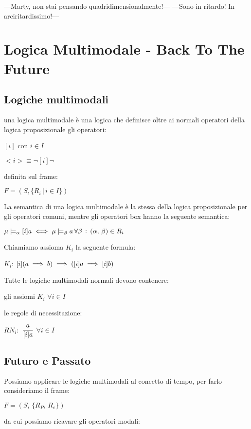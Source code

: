 \begin{savequote}[50mm]
---Marty, non stai pensando quadridimensionalmente!---
---Sono in ritardo! In arciritardissimo!---
 \end{savequote}


\chapter{Logica Multimodale - Back To The Future}


\section{Logiche multimodali}

una logica multimodale è una logica che definisce oltre ai normali
operatori della logica proposizionale gli operatori:

$[i]$ con $i\in I$

$<i>\equiv\neg[i]\neg$

definita sul frame:

$F=(S,\{R_{i}\,|\, i\in I\})$ 

La semantica di una logica multimodale è la stessa della logica proposizionale
per gli operatori comuni, mentre gli operatori box hanno la seguente
semantica:

$\mu\models_{\alpha}[i]a\iff\mu\models_{\beta}a\,\forall\beta\,:\,(\alpha,\,\beta)\in R_{i}$

Chiamiamo assioma $K_{i}$ la seguente formula:

$K_{i}$: $[i](a\implies b)\implies([i]a\implies[i]b)$

Tutte le logiche multimodali normali devono contenere:

gli assiomi $K_{i}$ $\forall i\in I$

le regole di necessitazione:

$RN_{i}:$ $\dfrac{a}{[i]a}$ $\forall i\in I$


\section{Futuro e Passato}

Possiamo applicare le logiche multimodali al concetto di tempo, per
farlo consideriamo il frame:

$F=(S,\,\{R_{P},\, R_{e}\})$

da cui possiamo ricavare gli operatori modali:

